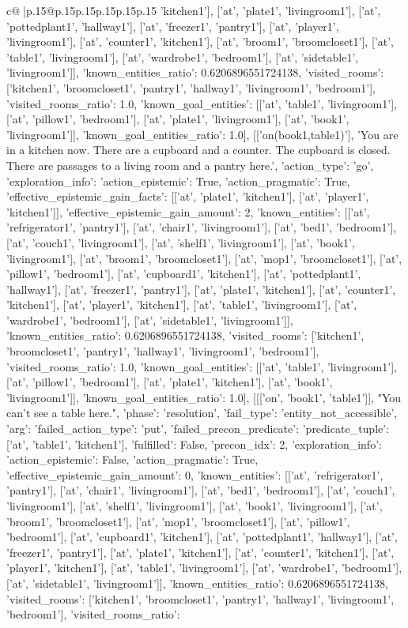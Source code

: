 \documentclass{article}
\begin{document}
{\begin{supertabular}{c@{$\;$}|p{.15\linewidth}@{}p{.15\linewidth}p{.15\linewidth}p{.15\linewidth}p{.15\linewidth}p{.15\linewidth}}
{{{'kitchen1'], ['at', 'plate1', 'livingroom1'], ['at', 'pottedplant1', 'hallway1'], ['at', 'freezer1', 'pantry1'], ['at', 'player1', 'livingroom1'], ['at', 'counter1', 'kitchen1'], ['at', 'broom1', 'broomcloset1'], ['at', 'table1', 'livingroom1'], ['at', 'wardrobe1', 'bedroom1'], ['at', 'sidetable1', 'livingroom1']], 'known_entities_ratio': 0.6206896551724138, 'visited_rooms': ['kitchen1', 'broomcloset1', 'pantry1', 'hallway1', 'livingroom1', 'bedroom1'], 'visited_rooms_ratio': 1.0, 'known_goal_entities': [['at', 'table1', 'livingroom1'], ['at', 'pillow1', 'bedroom1'], ['at', 'plate1', 'livingroom1'], ['at', 'book1', 'livingroom1']], 'known_goal_entities_ratio': 1.0}}], [['on(book1,table1)'], 'You are in a kitchen now. There are a cupboard and a counter. The cupboard is closed. There are passages to a living room and a pantry here.', {'action_type': 'go', 'exploration_info': {'action_epistemic': True, 'action_pragmatic': True, 'effective_epistemic_gain_facts': [['at', 'plate1', 'kitchen1'], ['at', 'player1', 'kitchen1']], 'effective_epistemic_gain_amount': 2, 'known_entities': [['at', 'refrigerator1', 'pantry1'], ['at', 'chair1', 'livingroom1'], ['at', 'bed1', 'bedroom1'], ['at', 'couch1', 'livingroom1'], ['at', 'shelf1', 'livingroom1'], ['at', 'book1', 'livingroom1'], ['at', 'broom1', 'broomcloset1'], ['at', 'mop1', 'broomcloset1'], ['at', 'pillow1', 'bedroom1'], ['at', 'cupboard1', 'kitchen1'], ['at', 'pottedplant1', 'hallway1'], ['at', 'freezer1', 'pantry1'], ['at', 'plate1', 'kitchen1'], ['at', 'counter1', 'kitchen1'], ['at', 'player1', 'kitchen1'], ['at', 'table1', 'livingroom1'], ['at', 'wardrobe1', 'bedroom1'], ['at', 'sidetable1', 'livingroom1']], 'known_entities_ratio': 0.6206896551724138, 'visited_rooms': ['kitchen1', 'broomcloset1', 'pantry1', 'hallway1', 'livingroom1', 'bedroom1'], 'visited_rooms_ratio': 1.0, 'known_goal_entities': [['at', 'table1', 'livingroom1'], ['at', 'pillow1', 'bedroom1'], ['at', 'plate1', 'kitchen1'], ['at', 'book1', 'livingroom1']], 'known_goal_entities_ratio': 1.0}}], [[['on', 'book1', 'table1']], "You can't see a table here.", {'phase': 'resolution', 'fail_type': 'entity_not_accessible', 'arg': {'failed_action_type': 'put', 'failed_precon_predicate': {'predicate_tuple': ['at', 'table1', 'kitchen1'], 'fulfilled': False, 'precon_idx': 2}}, 'exploration_info': {'action_epistemic': False, 'action_pragmatic': True, 'effective_epistemic_gain_amount': 0, 'known_entities': [['at', 'refrigerator1', 'pantry1'], ['at', 'chair1', 'livingroom1'], ['at', 'bed1', 'bedroom1'], ['at', 'couch1', 'livingroom1'], ['at', 'shelf1', 'livingroom1'], ['at', 'book1', 'livingroom1'], ['at', 'broom1', 'broomcloset1'], ['at', 'mop1', 'broomcloset1'], ['at', 'pillow1', 'bedroom1'], ['at', 'cupboard1', 'kitchen1'], ['at', 'pottedplant1', 'hallway1'], ['at', 'freezer1', 'pantry1'], ['at', 'plate1', 'kitchen1'], ['at', 'counter1', 'kitchen1'], ['at', 'player1', 'kitchen1'], ['at', 'table1', 'livingroom1'], ['at', 'wardrobe1', 'bedroom1'], ['at', 'sidetable1', 'livingroom1']], 'known_entities_ratio': 0.6206896551724138, 'visited_rooms': ['kitchen1', 'broomcloset1', 'pantry1', 'hallway1', 'livingroom1', 'bedroom1'], 'visited_rooms_ratio': }}}
\end{supertabular}}
\end{document}
